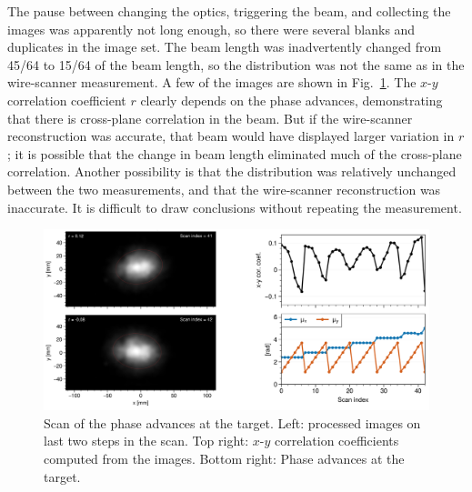 The pause between changing the optics, triggering the beam, and collecting the images was apparently not long enough, so there were several blanks and duplicates in the image set. The beam length was inadvertently changed from 45/64 to 15/64 of the beam length, so the distribution was not the same as in the wire-scanner measurement. A few of the images are shown in Fig.~\ref{fig:exp3_target_scan}. The $x$-$y$ correlation coefficient $r$ clearly depends on the phase advances, demonstrating that there is cross-plane correlation in the beam. But if the wire-scanner reconstruction was accurate, that beam would have displayed larger variation in $r$; it is possible that the change in beam length eliminated much of the cross-plane correlation. Another possibility is that the distribution was relatively unchanged between the two measurements, and that the wire-scanner reconstruction was inaccurate. It is difficult to draw conclusions without repeating the measurement. 

\begin{figure}[!p]
    \centering
    \includegraphics[width=\textwidth]{Images/chapter5/exp3/target_scan/target_scan.png}
    \caption{Scan of the phase advances at the target. Left: processed images on last two steps in the scan. Top right: $x$-$y$ correlation coefficients computed from the images. Bottom right: Phase advances at the target.}
    \label{fig:exp3_target_scan}
\end{figure}
%

